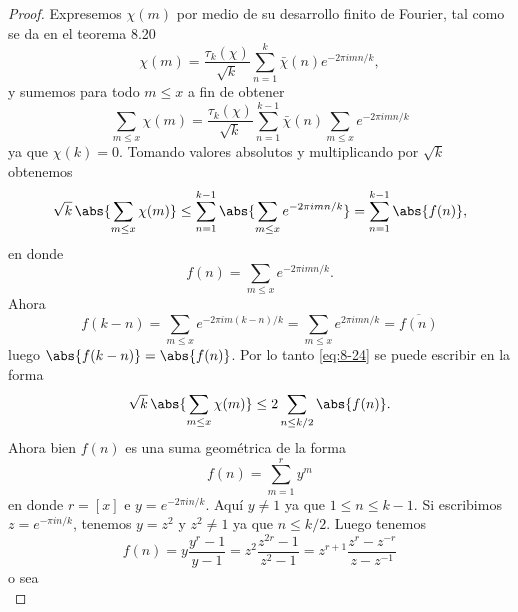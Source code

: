 \documentclass[12pt,a4paper]{book}
\begin{document}
    \begin{proof}
        Expresemos $\chi(m)$ por medio de su desarrollo finito de Fourier, tal como se da en
        el teorema 8.20
        \begin{equation*}
            \chi(m)=\frac{\tau_{k}(\chi)}{\sqrt{k}}\sum_{n=1}^{k}\bar{\chi}(n)e^{-2\pi imn/k},
        \end{equation*}
        y sumemos para todo $m\leq x$ a fin de obtener
        \begin{equation*}
            \sum_{m\leq x}\chi(m)=\frac{\tau_{k}(\chi)}{\sqrt{k}}\sum_{n=1}^{k-1}\bar{\chi}(n)\sum_{m\leq x}e^{-2\pi imn/k}
        \end{equation*}
        ya que $\chi(k)=0$. Tomando valores absolutos y multiplicando por $\sqrt{k}$
        obtenemos
        \begin{equation}\label{eq:8-24}
            \sqrt{k}\,\abs{\sum_{m\leq x}\chi(m)}\leq\sum_{n=1}^{k-1}\abs{\sum_{m\leq x}e^{-2\pi imn/k}}=\sum_{n=1}^{k-1}\abs{f(n)},
        \end{equation}
        en donde
        \begin{equation*}
            f(n)=\sum_{m\leq x}e^{-2\pi imn/k}.
        \end{equation*}
        Ahora
        \begin{equation*}
            f(k-n)=\sum_{m\leq x}e^{-2\pi im(k-n)/k}=\sum_{m\leq x}e^{2\pi imn/k}=\overline{f(n)}
        \end{equation*}
        luego $\abs{f(k-n)}=\abs{f(n)}$. Por lo tanto \eqref{eq:8-24} se puede escribir en la
        forma
        \begin{equation}\label{eq:8-25}
            \sqrt{k}\,\abs{\sum_{m\leq x}\chi(m)}\leq2\sum_{n\leq k/2}\abs{f(n)}.
        \end{equation}
        Ahora bien $f(n)$ es una suma geométrica de la forma
        \begin{equation*}
            f(n)=\sum_{m=1}^{r}y^{m}
        \end{equation*}
        en donde $r=[x]$ e $y=e^{-2\pi in/k}$. Aquí $y\neq1$ ya que $1\leq n\leq k-1$. Si
        escribimos $z=e^{-\pi in/k}$, tenemos $y=z^{2}$ y $z^{2}\neq1$ ya que $n\leq k/2$. Luego
        tenemos
        \begin{equation*}
            f(n)=y\frac{y^{r}-1}{y-1}=z^{2}\frac{z^{2r}-1}{z^{2}-1}=z^{r+1}\frac{z^{r}-z^{-r}}{z-z^{-1}}
        \end{equation*}
        o sea
        \begin{equation}\label{eq:8-26}

\end{equation}
\end{proof}
\end{document}
